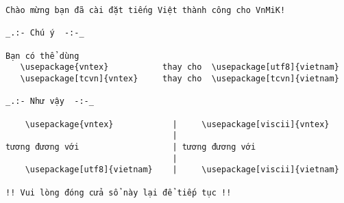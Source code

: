\documentclass{article}
\begin{document}
\begin{verbatim}
Chào mừng bạn đã cài đặt tiếng Việt thành công cho VnMiK!

_.:- Chú ý  -:-_

Bạn có thể dùng
   \usepackage{vntex}           thay cho  \usepackage[utf8]{vietnam}
   \usepackage[tcvn]{vntex}     thay cho  \usepackage[tcvn]{vietnam}

_.:- Như vậy  -:-_

    \usepackage{vntex}            |     \usepackage[viscii]{vntex} 
                                  |
tương đương với                   | tương đương với
                                  |
    \usepackage[utf8]{vietnam}    |     \usepackage[viscii]{vietnam}

!! Vui lòng đóng cửa sổ này lại để tiếp tục !!	
\end{verbatim}
\end{document}
